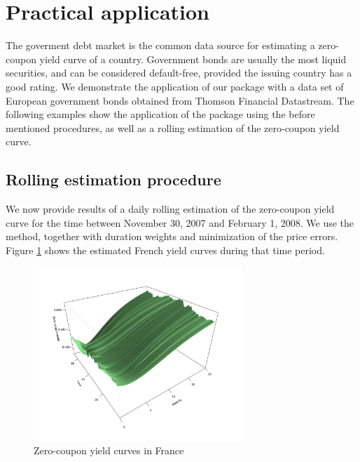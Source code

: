\section{Practical application}
\label{sec:pract-appl}

The goverment debt market is the common data source for estimating a zero-coupon yield curve of a country. Government bonds are usually the most liquid securities, and can be considered default-free, provided the issuing country has a good rating. We demonstrate the application of our package with a data set of European government bonds obtained from Thomson Financial Datastream. The following examples show the application of the package using the before mentioned procedures, as well as a rolling estimation of the zero-coupon yield curve.




\subsection{Rolling estimation procedure}

We now provide results of a daily rolling estimation of the zero-coupon yield curve for the time between November 30, 2007 and February 1, 2008. We use the \cite{Svensson1994} method, together with duration weights and minimization of the price errors. Figure \ref{fig:3dplot} shows the estimated French yield curves during that time period.

\begin{figure}[htb]
  \begin{center}
\includegraphics[width=0.7\textwidth]{3dplot}
  \caption{Zero-coupon yield curves in France}
  \label{fig:3dplot}
\end{center}
\end{figure}

